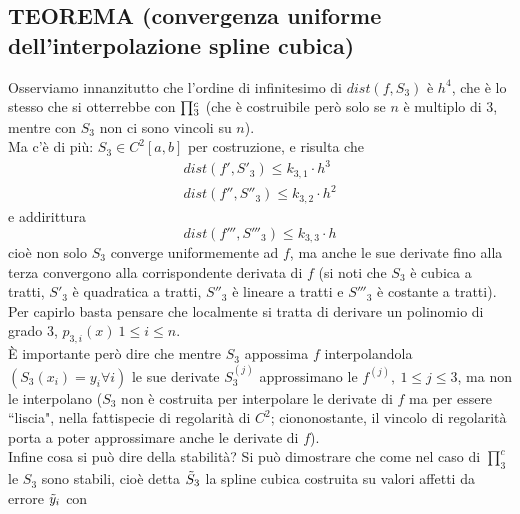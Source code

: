 \subsection{TEOREMA (convergenza uniforme dell'interpolazione spline cubica)}
\begin{center}
\end{center}
Osserviamo innanzitutto che l'ordine di infinitesimo di $dist(f, S_3)$ è $h^4$, che è lo stesso che si otterrebbe con $\begin{matrix}\prod\end{matrix}_3^c$ (che è costruibile però solo se $n$ è multiplo di 3, mentre con $S_3$ non ci sono vincoli su $n$).\\
Ma c'è di più: $S_3 \in C^2 [a,b]$ per costruzione, e risulta che
\[
\begin{split}
    dist(f', S'_3) \leq k_{3,1} \cdot h^3 \\
    dist(f'', S''_3) \leq k_{3,2} \cdot h^2
\end{split}
\]
e addirittura
\[
dist(f''', S'''_3) \leq k_{3,3} \cdot h
\]
cioè non solo $S_3$ converge uniformemente ad $f$, ma anche le sue derivate fino alla terza convergono alla corrispondente derivata di $f$ (si noti che $S_3$ è cubica a tratti, $S'_3$ è quadratica a tratti, $S''_3$ è lineare a tratti e $S'''_3$ è costante a tratti).\\
Per capirlo basta pensare che localmente si tratta di derivare un polinomio di grado 3, $p_{3,i} (x) \ 1 \leq i \leq n$.\\
È importante però dire che mentre $S_3$ appossima $f$ interpolandola $(S_3 (x_i) = y_i \forall i)$ le sue derivate $S_3^{(j)}$ approssimano le $f^{(j)}, \ 1 \leq j \leq 3$, ma non le interpolano ($S_3$ non è costruita per interpolare le derivate di $f$ ma per essere ``liscia", nella fattispecie di regolarità di $C^2$; ciononostante, il vincolo di regolarità porta a poter approssimare anche le derivate di $f$).\\
Infine cosa si può dire della stabilità? Si può dimostrare che come nel caso di $\prod_3^c$ le $S_3$ sono stabili, cioè detta $\Tilde{S}_3$ la spline cubica costruita su valori affetti da errore $\Tilde{y}_i$ con 
